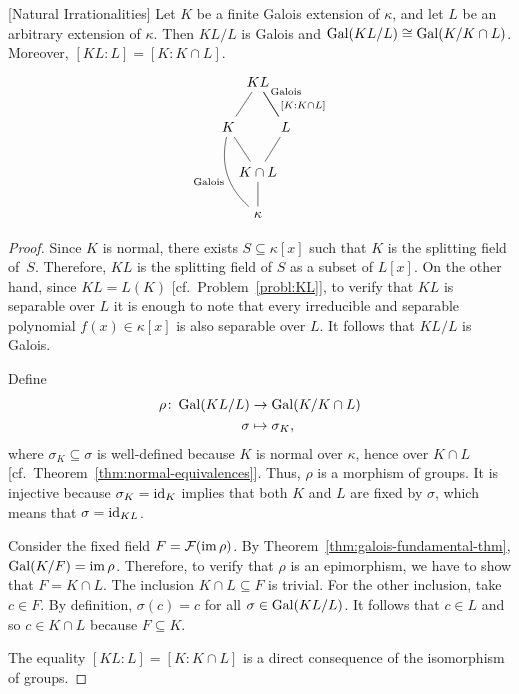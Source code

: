 \begin{thm} {\rm[Natural Irrationalities]}
     Let\/ $K$ be a finite Galois extension of\/ $\kappa$, and let\/ $L$ be an arbitrary extension of\/ $\kappa$. Then\/ $K L / L$ is Galois and\/ $\operatorname{Gal}(KL / L) \cong \operatorname{Gal}(K / K \cap L)$. Moreover, $[KL : L] = [K : K \cap L]$.
     \small
     $$
        \begin{tikzcd}[column sep=-0.2cm]
                &KL\\
            K
                    \arrow[ru,no head]
                &&L
                    \arrow[lu,"\text{\rm Galois}"',no head,pos=0.75]
                    \arrow[lu,"{[K:K\cap L]}"',no head,pos=0.1]\\
                &K\cap L
                    \arrow[lu,no head]
                    \arrow[ru,no head]\\
                &\kappa
                    \arrow[u,no head]
                    \arrow[luu,"\text{\rm Galois}",no head,bend left]&
        \end{tikzcd}
     $$
     \normalsize
\end{thm}

\begin{proof}
    Since $K$ is normal, there exists $S\subseteq\kappa[x]$ such that $K$ is the splitting field of~$S$. Therefore, $KL$ is the splitting field of $S$ as a subset of $L[x]$. On the other hand, since $KL=L(K)$  [cf.~Problem~\ref{probl:KL}], to verify that $KL$ is separable over $L$ it is enough to note that every irreducible and separable polynomial $f(x)\in\kappa[x]$ is also separable over $L$. It follows that $KL/L$ is Galois.

    Define
    \begin{align*}
        \rho\colon\operatorname{Gal}(KL/L)&\to\operatorname{Gal}(K/K\cap L)\\
        \sigma&\mapsto\sigma_K,
    \end{align*}
    where $\sigma_K\subseteq\sigma$ is well-defined because $K$ is normal over $\kappa$, hence over $K\cap L$ [cf.~Theorem~\ref{thm:normal-equivalences}]. Thus, $\rho$ is a morphism of groups. It is injective because $\sigma_K=\operatorname{id}_K$ implies that both $K$ and $L$ are fixed by $\sigma$, which means that $\sigma=\operatorname{id}_{KL}$.

    Consider the fixed field $F=\mathcal F(\operatorname{im}\rho)$. By Theorem~\ref{thm:galois-fundamental-thm}, $\operatorname{Gal}(K/F)=\operatorname{im}\rho$. Therefore, to verify that $\rho$ is an epimorphism, we have to show that $F=K\cap L$. The inclusion $K\cap L\subseteq F$ is trivial. For the other inclusion, take $c\in F$. By definition, $\sigma(c)=c$ for all $\sigma\in\operatorname{Gal}(KL/L)$. It follows that $c\in L$ and so $c\in K\cap L$ because $F\subseteq K$.

    The equality $[KL:L]=[K:K\cap L]$ is a direct consequence of the isomorphism of groups.
\end{proof}


